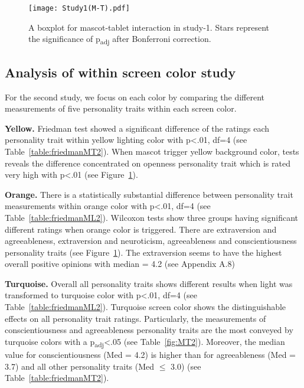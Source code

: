 \begin{figure}[!htb]
    \centering
    \texttt{[image: Study1(M-T).pdf]}
    \caption[]{A boxplot for mascot-tablet interaction in study-1.
    Stars represent the significance of p\textsubscript{adj} after Bonferroni correction.\footnotemark}
    \label{fig:MT1}
\end{figure}
\subsection{Analysis of within screen color study}
\label{subsec:MTstudy2}
For the second study, we focus on each color by comparing the different measurements of five
personality traits within each screen color.

\par\textbf{Yellow.}
Friedman test showed a significant difference of the ratings each personality trait
within yellow lighting color with p<.01, df=4 (see Table~\ref{table:friedmanMT2}).
When mascot trigger yellow background color, tests reveals the difference concentrated on openness
personality trait which is rated very high with p<.01 (see Figure~\ref{fig:MT1}).

\par\textbf{Orange.}
There is a statistically substantial difference between personality trait measurements within
orange color with p<.01, df=4 (see Table~\ref{table:friedmanML2}).
Wilcoxon tests show three groups having significant different ratings when orange
color is triggered.
There are extraversion and agreeableness, extraversion and neuroticism, agreeableness and
conscientiousness personality traits (see Figure~\ref{fig:MT1}).
The extraversion seems to have the highest overall positive opinions
with median = 4.2 (see Appendix A.8)

\par\textbf{Turquoise.}
Overall all personality traits shows different results when light was transformed to turquoise color
with p<.01, df=4 (see Table~\ref{table:friedmanML2}).
Turquoise screen color shows the distinguishable effects on all personality trait ratings.
Particularly, the measurements of conscientiousness and agreeableness personality traits are the most
conveyed by turquoise colors with a p\textsubscript{adj}<.05 (see Table~\ref{fig:MT2}).
Moreover, the median value for conscientiousness (Med = 4.2) is higher than for agreeableness
(Med = 3.7) and all other personality traits (Med $\leq$ 3.0) (see Table~\ref{table:friedmanMT2}).

